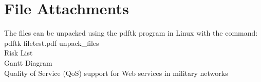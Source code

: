 \section{File Attachments}\label{File Attachments} 
The files can be unpacked using the pdftk program in Linux with the command: 
    pdftk filetest.pdf unpack\_files \\
     Risk List \\
     Gantt Diagram \\
     Quality of Service (QoS) support for Web services in military networks \\
    
